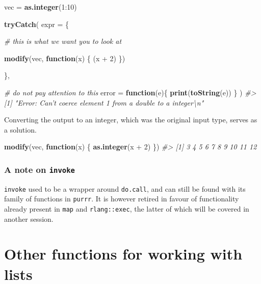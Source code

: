 \documentclass[]{book}
\newenvironment{Shaded}{}{}
\newcommand{\CommentTok}[1]{\textcolor[rgb]{0.38,0.63,0.69}{\textit{#1}}}
\newcommand{\ControlFlowTok}[1]{\textcolor[rgb]{0.00,0.44,0.13}{\textbf{#1}}}
\newcommand{\DataTypeTok}[1]{\textcolor[rgb]{0.56,0.13,0.00}{#1}}
\newcommand{\DecValTok}[1]{\textcolor[rgb]{0.25,0.63,0.44}{#1}}
\newcommand{\KeywordTok}[1]{\textcolor[rgb]{0.00,0.44,0.13}{\textbf{#1}}}
\newcommand{\NormalTok}[1]{#1}
\newcommand{\OperatorTok}[1]{\textcolor[rgb]{0.40,0.40,0.40}{#1}}
\newcommand{\StringTok}[1]{\textcolor[rgb]{0.25,0.44,0.63}{#1}}
\begin{document}
\begin{Shaded}
\begin{Highlighting}[]
\NormalTok{vec =}\StringTok{ }\KeywordTok{as.integer}\NormalTok{(}\DecValTok{1}\OperatorTok{:}\DecValTok{10}\NormalTok{)}

\KeywordTok{tryCatch}\NormalTok{(}
  \DataTypeTok{expr =}\NormalTok{ \{}
    
    \CommentTok{# this is what we want you to look at}
    
    \KeywordTok{modify}\NormalTok{(vec, }\ControlFlowTok{function}\NormalTok{(x) \{ (x }\OperatorTok{+}\StringTok{ }\DecValTok{2}\NormalTok{) \})}
    
\NormalTok{    \},}
  
  \CommentTok{# do not pay attention to this}
  \DataTypeTok{error =} \ControlFlowTok{function}\NormalTok{(e)\{}
    \KeywordTok{print}\NormalTok{(}\KeywordTok{toString}\NormalTok{(e))}
\NormalTok{  \}}
\NormalTok{)}
\CommentTok{#> [1] "Error: Can't coerce element 1 from a double to a integer\textbackslash{}n"}
\end{Highlighting}
\end{Shaded}

Converting the output to an integer, which was the original input type, serves as a solution.

\begin{Shaded}
\begin{Highlighting}[]
\KeywordTok{modify}\NormalTok{(vec, }\ControlFlowTok{function}\NormalTok{(x) \{ }\KeywordTok{as.integer}\NormalTok{(x }\OperatorTok{+}\StringTok{ }\DecValTok{2}\NormalTok{) \})}
\CommentTok{#>  [1]  3  4  5  6  7  8  9 10 11 12}
\end{Highlighting}
\end{Shaded}

\hypertarget{a-note-on-invoke}{%
\subsubsection*{\texorpdfstring{A note on \texttt{invoke}}{A note on invoke}}\label{a-note-on-invoke}}

\texttt{invoke} used to be a wrapper around \texttt{do.call}, and can still be found with its family of functions in \texttt{purrr}. It is however retired in favour of functionality already present in \texttt{map} and \texttt{rlang::exec}, the latter of which will be covered in another session.

\hypertarget{other-functions-for-working-with-lists}{%
\section{Other functions for working with lists}\label{other-functions-for-working-with-lists}}
\end{document}
